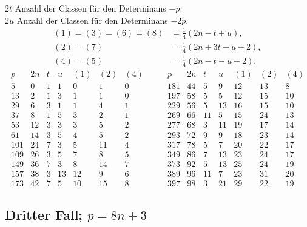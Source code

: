 \documentclass[12pt]{article}
\begin{document}
$2t$ Anzahl der Classen für den Determinans $-p$;\\
$2u$ Anzahl der Classen für den Determinans $-2p$.
\[
\begin{aligned}
(1)=(3)=(6)=(8)&=\frac14(2n-t+u),\\
(2)=(7)&=\frac14(2n+3t-u+2),\\
(4)=(5)&=\frac14(2n-t-u+2).
\end{aligned}
\]
{\scriptsize
\[
\begin{array}{r|r|r|r|r|r|r}
p&2n&t&u&(1)&(2)&(4)\\\hline
5&0&1&1&0&1&0\\
13&2&1&3&1&1&0\\
29&6&3&1&1&4&1\\
37&8&1&5&3&2&1\\
53&12&3&3&3&5&2\\
61&14&3&5&4&5&2\\
101&24&7&3&5&11&4\\
109&26&3&5&7&8&5\\
149&36&7&3&8&14&7\\
157&38&3&13&12&9&6\\
173&42&7&5&10&15&8
\end{array}
\qquad
\begin{array}{r|r|r|r|r|r|r}
p&2n&t&u&(1)&(2)&(4)\\\hline
181&44&5&9&12&13&8\\
197&58&5&5&12&15&10\\
229&56&5&13&16&15&10\\
269&66&11&5&15&24&13\\
277&68&3&11&19&17&14\\
293&72&9&9&18&23&14\\
317&78&5&7&20&22&17\\
349&86&7&13&23&24&17\\
373&92&5&13&25&24&19\\
389&96&11&7&23&31&20\\
397&98&3&21&29&22&19
\end{array}
\]
}

\subsection*{Dritter Fall; \(p=8n+3\)}
\end{document}
